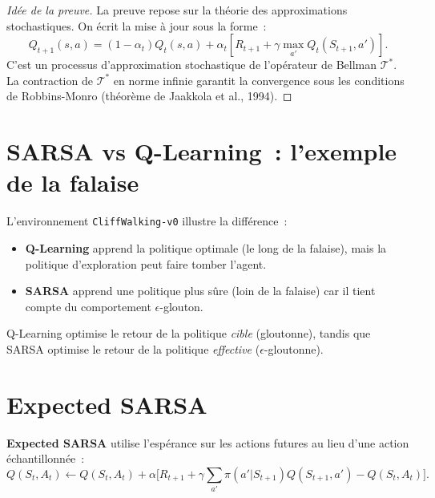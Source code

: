 \begin{proof}[Id\'ee de la preuve]
La preuve repose sur la th\'eorie des approximations stochastiques.
On \'ecrit la mise \`a jour sous la forme~:
\[
    Q_{t+1}(s,a) = (1-\alpha_t)Q_t(s,a) + \alpha_t [R_{t+1} + \gamma \max_{a'} Q_t(S_{t+1}, a')].
\]
C'est un processus d'approximation stochastique de l'op\'erateur de Bellman
$\mathcal{T}^*$. La contraction de $\mathcal{T}^*$ en norme infinie garantit
la convergence sous les conditions de Robbins-Monro (th\'eor\`eme de Jaakkola
et al., 1994).
\end{proof}

\section{SARSA vs Q-Learning~: l'exemple de la falaise}

\begin{exemple}
L'environnement \texttt{CliffWalking-v0} illustre la diff\'erence~:
\begin{itemize}
    \item \textbf{Q-Learning} apprend la politique optimale (le long de la falaise),
    mais la politique d'exploration peut faire tomber l'agent.
    \item \textbf{SARSA} apprend une politique plus s\^ure (loin de la falaise)
    car il tient compte du comportement $\epsilon$-glouton.
\end{itemize}
Q-Learning optimise le retour de la politique \emph{cible} (gloutonne), tandis que
SARSA optimise le retour de la politique \emph{effective} ($\epsilon$-gloutonne).
\end{exemple}

\section{Expected SARSA}

\begin{definition}
\textbf{Expected SARSA} utilise l'esp\'erance sur les actions futures au lieu
d'une action \'echantillonn\'ee~:
\[
    Q(S_t, A_t) \leftarrow Q(S_t, A_t) + \alpha \Big[
    R_{t+1} + \gamma \sum_{a'} \pi(a' | S_{t+1}) Q(S_{t+1}, a') - Q(S_t, A_t) \Big].
\]
\end{definition}

